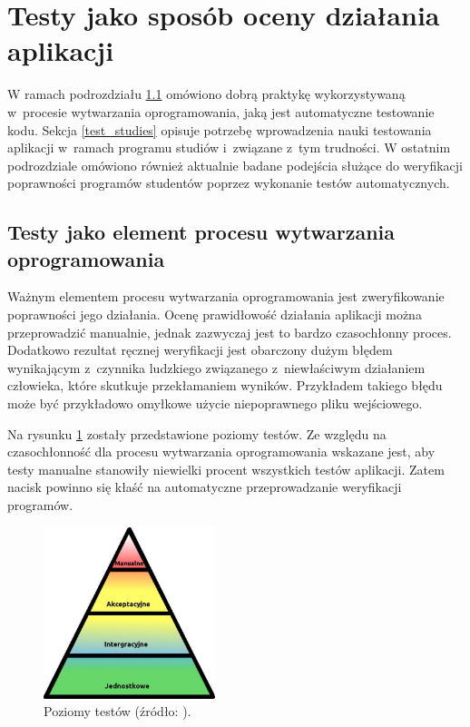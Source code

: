 \section{Testy jako sposób oceny działania aplikacji}
\label{programs-testing}

W ramach podrozdziału \ref{test_practices} omówiono dobrą praktykę wykorzystywaną w~procesie wytwarzania oprogramowania, jaką jest automatyczne testowanie kodu.
Sekcja \ref{test_studies} opisuje potrzebę wprowadzenia nauki testowania aplikacji w~ramach programu studiów i~związane z~tym trudności.
W ostatnim podrozdziale omówiono również aktualnie badane podejścia służące do weryfikacji poprawności programów studentów poprzez wykonanie testów automatycznych.

\subsection{Testy jako element procesu wytwarzania oprogramowania}
\label{test_practices}

Ważnym elementem procesu wytwarzania oprogramowania jest zweryfikowanie poprawności jego działania.
Ocenę prawidłowość działania aplikacji można przeprowadzić manualnie, jednak zazwyczaj jest to bardzo czasochłonny proces.
Dodatkowo rezultat ręcznej weryfikacji jest obarczony dużym błędem wynikającym z~czynnika ludzkiego związanego z~niewłaściwym działaniem człowieka, które skutkuje przekłamaniem wyników.
Przykładem takiego błędu może być przykładowo omyłkowe użycie niepoprawnego pliku wejściowego.

Na rysunku \ref{fig:tests-levels} zostały przedstawione poziomy testów.
Ze względu na czasochłonność dla procesu wytwarzania oprogramowania wskazane jest, aby testy manualne stanowiły niewielki procent wszystkich testów aplikacji.
Zatem nacisk powinno się kłaść na automatyczne przeprowadzanie weryfikacji programów.

\begin{figure}[h]
    \centering
    \includegraphics[width = 5cm]{chapter02/tests_levels.jpg}
    \caption{Poziomy testów (źródło: \cite{tests-levels}).}
    \label{fig:tests-levels}
\end{figure}

